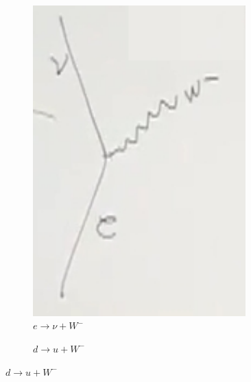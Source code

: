 \documentclass[]{article}
\begin{document}
\begin{figure}[H]
	\caption{W are like photons or gluons}\label{fig:W:photon:fluon}
	\begin{subfigure}{0.2\textwidth}
		\caption{$e \rightarrow\nu + W^-$}\label{fig:2-5-W1}
		\includegraphics[width=0.9\textwidth]{2-5-W1}
	\end{subfigure}
	\begin{subfigure}{0.2\textwidth}
		\caption{$d \rightarrow u + W^-$}

\end{subfigure}
\end{figure}
\end{document}
